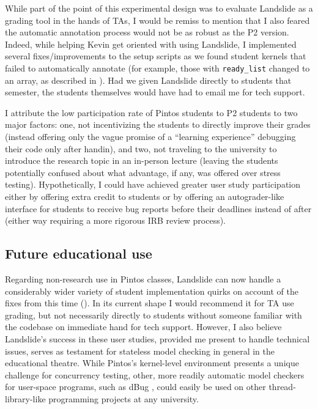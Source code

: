 While part of the point of this experimental design was to evaluate Landslide as a grading tool in the hands of TAs,
I would be remiss to mention that I also feared the automatic annotation process would not be as robust as the P2 version.
Indeed, while helping Kevin get oriented with using Landslide,
I implemented
several
fixes/improvements to the setup scripts
as we found student kernels that failed to automatically annotate
(for example, those with {\tt ready\_list} changed to an array,
as described in \sect{\ref{sec:education-pintos-instrumentation}}).
Had we given Landslide directly to students that semester,
the students themselves would have had to email me for tech support.

I attribute the low participation rate of Pintos students to P2 students to two major factors:
one, not incentivizing the students to directly improve their grades
(instead offering only the vague promise of a ``learning experience'' debugging their code only after handin),
and two, not traveling to the university to introduce the research topic in an in-person lecture
(leaving the students potentially confused about what advantage, if any, was offered over stress testing).
Hypothetically, I could have achieved greater user study participation
either by offering extra credit to students
or by offering an autograder-like interface for students to receive bug reports before their deadlines instead of after
(either way requiring a more rigorous IRB review process).

\subsection{Future educational use}


Regarding non-research use in Pintos classes,
Landslide can now handle a considerably wider variety of student implementation quirks
on account of the fixes from this time (\sect{\ref{sec:education-pintos-instrumentation}}).
In its current shape I would recommend it for TA use grading,
but not necessarily directly to students without someone familiar with the codebase on immediate hand for tech support.
However, I also believe Landslide's success in these user studies,
provided me present to handle technical issues,
serves as testament for stateless model checking in general in the educational theatre.
While Pintos's kernel-level environment presents a unique challenge for concurrency testing,
other, more readily automatic model checkers for user-space programs,
such as dBug \cite{dbug-ssv},
could easily be used on other thread-library-like programming projects at any university.

